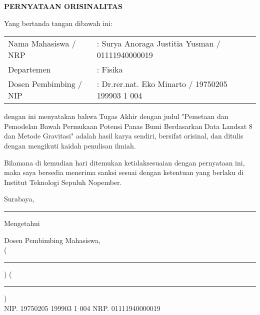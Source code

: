 \newpage
\thispagestyle{empty}
\begin{center}
    \textbf{PERNYATAAN ORISINALITAS}
\end{center}

\vskip20pt
Yang bertanda tangan dibawah ini:
\vskip15pt

\begin{tabular}[h]{ll}
    Nama Mahasiswa / NRP &: Surya Anoraga Justitia Yusman / 01111940000019\\
    Departemen &: Fisika\\
    Dosen Pembimbing / NIP &: Dr.rer.nat. Eko Minarto / 19750205 199903 1 004\\
\end{tabular}

\vskip20pt

dengan ini menyatakan bahwa Tugas Akhir dengan judul "Pemetaan dan Pemodelan Bawah Permukaan Potensi Panas Bumi Berdasarkan Data Landsat 8 dan Metode Gravitasi" adalah hasil karya sendiri, bersifat orisinal, dan ditulis dengan mengikuti kaidah penulisan ilmiah.

Bilamana di kemudian hari ditemukan ketidaksesuaian dengan pernyataan ini, maka saya bersedia menerima sanksi sesuai dengan ketentuan yang berlaku di Institut Teknologi Sepuluh Nopember.


\hfill Surabaya,\rule{3cm}{0.2pt}

Mengetahui
\vskip 3pt

Dosen Pembimbing \hspace{5cm} Mahasiswa,\\
\vskip2cm
(\rule{5cm}{0.2pt}) \hspace{3.2cm} (\rule{5cm}{0.2pt}) \\
NIP. 19750205 199903 1 004 \hspace{3.5cm} NRP. 01111940000019\\
